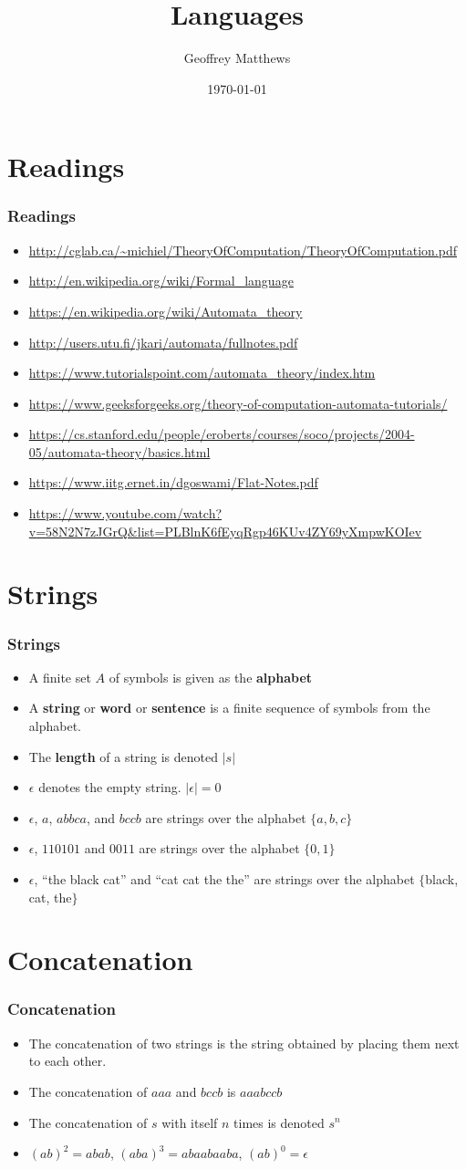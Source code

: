 \documentclass{beamer}
\title[Languages]
{
Languages
}
\subtitle{} %
\author[Geoffrey Matthews]
{Geoffrey Matthews}
\institute[WWU/CS]
{
  Department of Computer Science\\
  Western Washington University
}
\date{\today}
\newcommand{\emptystring}{\ensuremath{\epsilon}}
\newcommand{\bi}{\begin{itemize}}
\newcommand{\li}{\item}
\newcommand{\ei}{\end{itemize}}
\newcommand{\sect}[1]{
\section{#1}
\begin{frame}[fragile]\frametitle{#1}
}
\begin{document}
\begin{frame}
  \titlepage
\end{frame}


\newcommand{\myref}[1]{\small\item\url{#1}}
\newcommand{\myreft}[1]{\footnotesize\item\url{#1}}


\sect{Readings}

\begin{itemize}

\myreft{http://cglab.ca/~michiel/TheoryOfComputation/TheoryOfComputation.pdf}

\myreft{http://en.wikipedia.org/wiki/Formal_language}
\myreft{https://en.wikipedia.org/wiki/Automata_theory}

\myreft{http://users.utu.fi/jkari/automata/fullnotes.pdf}
\myreft{https://www.tutorialspoint.com/automata_theory/index.htm}
\myreft{https://www.geeksforgeeks.org/theory-of-computation-automata-tutorials/}
\myreft{https://cs.stanford.edu/people/eroberts/courses/soco/projects/2004-05/automata-theory/basics.html}
\myreft{https://www.iitg.ernet.in/dgoswami/Flat-Notes.pdf}

\myreft{https://www.youtube.com/watch?v=58N2N7zJGrQ&list=PLBlnK6fEyqRgp46KUv4ZY69yXmpwKOIev}
\end{itemize}

\end{frame}

\sect{Strings}

\bi
\li A finite set $A$ of symbols is given as the {\bf alphabet}
\li A {\bf string} or {\bf word} or {\bf sentence} is a finite sequence of symbols from the alphabet.
\li The {\bf length} of a string is denoted $|s|$
\li $\emptystring$ denotes the empty string. $|\emptystring|=0$
\bigskip
\li $\emptystring$, $a$, $abbca$, and $bccb$ are strings over the alphabet $\{a,b,c\}$
\li $\emptystring$, $110101$ and $0011$ are strings over the alphabet $\{0,1\}$
\li $\emptystring$, ``the black cat'' and ``cat cat the the'' are strings over the alphabet $\{$black, cat, the$\}$
\ei

\end{frame}

\sect{Concatenation}
\bi
\li The concatenation of two strings is the string obtained by placing them next to each other.
\li The concatenation of $aaa$ and $bccb$ is $aaabccb$
\li The concatenation of $s$ with itself $n$ times is denoted $s^n$
\li $(ab)^2 = abab$, $(aba)^3 = abaabaaba$, $(ab)^0 = \emptystring$
\ei
\end{frame}
\end{document}
